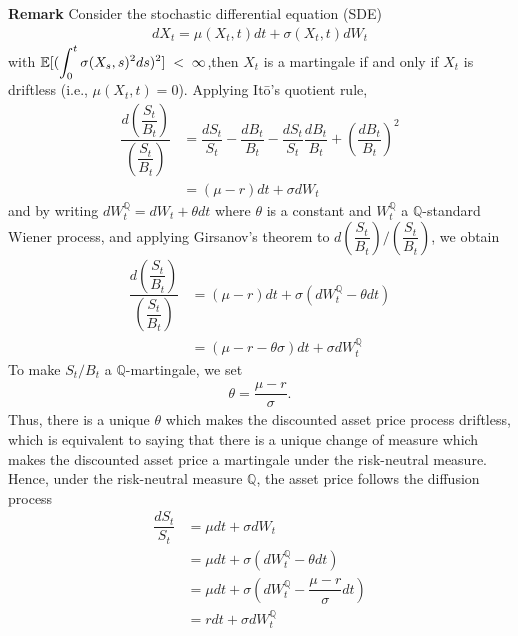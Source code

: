 \textbf{Remark} Consider the stochastic differential equation (SDE)
\begin{align*}
dX_t=\mu(X_t,t)dt+\sigma(X_t,t)dW_t
\end{align*}
with $\mathbb{E}[(\displaystyle \int_{0}^{t}\sigma(X_s,s)^2ds)^2]\hspace{0.1cm}< \hspace{0.1cm}\infty$,then $X_t$ is a martingale if and only if $X_t$ is driftless (i.e., $\mu(X_t,t)=0$). Applying It\=o's quotient rule, 
\begin{align*}
\dfrac{d\left(\dfrac{S_t}{B_t}\right)}{\left(\dfrac{S_t}{B_t}\right)}&=\dfrac{dS_t}{S_t}-\dfrac{dB_t}{B_t}-\dfrac{dS_t}{S_t}\dfrac{dB_t}{B_t}+\left(\dfrac{dB_t}{B_t}\right)^2\\
&=(\mu-r)dt+\sigma dW_t
\end{align*}
and by writing $d W_t^\mathbb{Q}=dW_t+\theta dt$ where $\theta$ is a constant and $W_t^\mathbb{Q}$ a $\mathbb{Q}$-standard Wiener process, and applying Girsanov’s theorem to $d\left(\dfrac{S_t}{B_t}\right)/\left(\dfrac{S_t}{B_t}\right)$, we obtain
\begin{align*}
\dfrac{d\left(\dfrac{S_t}{B_t}\right)}{\left(\dfrac{S_t}{B_t}\right)}&=(\mu-r)dt+\sigma(dW_t^\mathbb{Q}-\theta dt)\\ 
&= (\mu-r-\theta\sigma)dt+\sigma d W_t^\mathbb{Q}
\end{align*}
To make $S_t/B_t$ a $\mathbb{Q}$-martingale, we set
\begin{align*}
\theta=\dfrac{\mu-r}{\sigma}.
\end{align*}
Thus, there is a unique $\theta$ which makes the discounted asset price process driftless, which is
equivalent to saying that there is a unique change of measure which makes the discounted asset
price a martingale under the risk-neutral measure.\\
\indent Hence, under the risk-neutral measure $\mathbb{Q}$, the asset price follows the diffusion process
\begin{align*}
\dfrac{dS_t}{S_t}&=\mu dt+\sigma dW_t\\
&=\mu dt +\sigma( dW_t^\mathbb{Q} - \theta dt)\\
&=\mu dt +\sigma( d W_t^\mathbb{Q}-\dfrac{\mu - r}{\sigma}dt)\\
&=rdt+\sigma d W_t^\mathbb{Q}
\end{align*}
